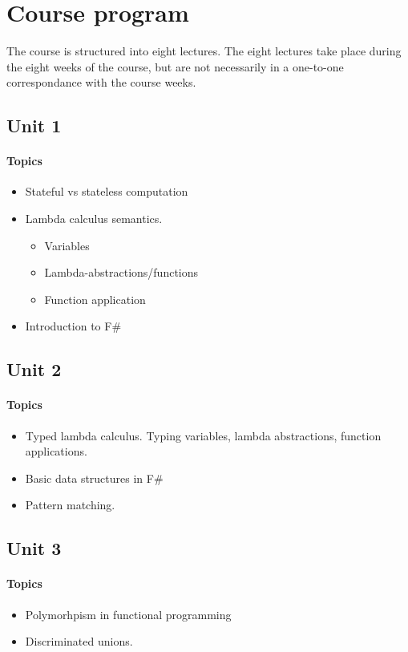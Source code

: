 \section{Course program}
The course is structured into eight lectures.
The eight lectures take place during the eight weeks of the course, but are not necessarily in a one-to-one correspondance with the course weeks.

\subsection*{Unit 1}
\paragraph*{Topics}
\begin{itemize}[noitemsep]
	\item Stateful vs stateless computation
  \item Lambda calculus semantics.
    \begin{itemize}[noitemsep]
      \item Variables
      \item Lambda-abstractions/functions
      \item Function application
    \end{itemize}	
  \item Introduction to F\#
\end{itemize}

\subsection*{Unit 2}
\paragraph*{Topics}			
\begin{itemize}[noitemsep]
	\item Typed lambda calculus. Typing variables, lambda abstractions, function applications.
  \item Basic data structures in F\#
  \item Pattern matching.
\end{itemize}

\subsection*{Unit 3}
\paragraph*{Topics}			
\begin{itemize}[noitemsep]
  \item Polymorhpism in functional programming
	\item Discriminated unions.
\end{itemize}

